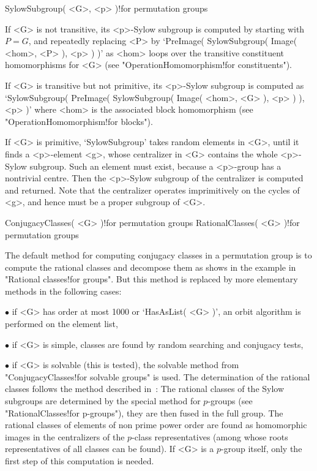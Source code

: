 \>SylowSubgroup( <G>, <p> )!{for permutation groups}

If <G> is not transitive, its <p>-Sylow subgroup  is computed by starting
with  $P=G$, and repeatedly   replacing <P> by  `PreImage( SylowSubgroup(
Image( <hom>, <P>   ),  <p> ) )'   as  <hom> loops  over  the  transitive
constituent   homomorphisms  for <G>   (see    "OperationHomomorphism!for
constituents").

If  <G>  is  transitive but  not   primitive,  its <p>-Sylow subgroup  is
computed as `SylowSubgroup( PreImage( SylowSubgroup( Image( <hom>, <G> ),
<p> ) ),  <p> )' where  <hom> is the  associated block homomorphism  (see
"OperationHomomorphism!for blocks").

If <G> is primitive, `SylowSubgroup'  takes random elements in <G>, until
it finds a  <p>-element <g>, whose centralizer in  <G> contains the whole
<p>-Sylow subgroup. Such an element must exist, because a <p>-group has a
nontrivial  centre. Then the <p>-Sylow  subgroup   of the centralizer  is
computed and returned. Note  that the centralizer  operates imprimitively
on the cycles of <g>, and hence must be a proper subgroup of <G>.

\>ConjugacyClasses( <G> )!{for permutation groups}
\>RationalClasses( <G> )!{for permutation groups}

The default method for computing conjugacy classes in a permutation group
is to compute the  rational classes and decompose   them as shows in  the
example in "Rational classes!for groups".  But this method is replaced by
more elementary methods in the following cases:
\beginlist
  \item{$\bullet$} if  <G> has order at most  1000 or `HasAsList( <G> )',
    an orbit algorithm is performed on the element list,
  \item{$\bullet$}   if <G> is  simple,   classes  are  found by   random
    searching and conjugacy tests,
  \item{$\bullet$} if  <G> is  solvable (this  is tested),   the solvable
    method from "ConjugacyClasses!for solvable groups" is used.
\endlist
The  determination of the rational  classes follows  the method described
in~\cite{Butler94}:  The rational  classes  of  the Sylow subgroups   are
determined by the special method for $p$-groups (see "RationalClasses!for
p-groups"), they  are then fused in the  full group. The rational classes
of elements of non  prime power order are  found as homomorphic images in
the   centralizers of  the  $p$-class representatives  (among whose roots
representatives  of all  classes can be  found).  If  <G>  is a $p$-group
itself, only the first step of this computation is needed.

